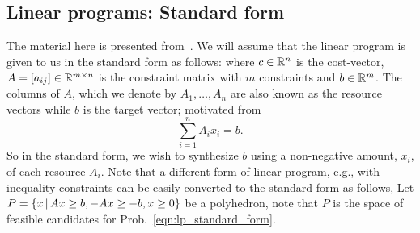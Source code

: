 \documentclass[letterpaper, 10pt, twocolumn, reqno]{amsart}
\begin{document}
\subsection{Linear programs: Standard form}
\label{ssec:lp_standard}

The material here is presented from~\cite{bertsimas1997introduction}. We will assume that the linear program is given to us in the standard form as follows:
where $c \in \mathbb{R}^n$ is the cost-vector, $A = [a_{ij}] \in \mathbb{R}^{m \times n}$ is the constraint matrix with $m$ constraints and $b \in \mathbb{R}^m$. The columns of $A$, which we denote by $A_1, \ldots, A_n$ are also known as the resource vectors while $b$ is the target vector; motivated from
$$\sum_{i=1}^n A_i x_i =b.$$
So in the standard form, we wish to synthesize $b$ using a non-negative amount, $x_i$, of each resource $A_i$. Note that a different form of linear program, e.g., with inequality constraints can be easily converted to the standard form as follows,
Let $P = \left\{x \, \vert \, Ax \geq b, -Ax \geq -b, x \geq 0\right\}$ be a polyhedron, note that $P$ is the space of feasible candidates for Prob.~\eqref{eqn:lp_standard_form}.
\end{document}
